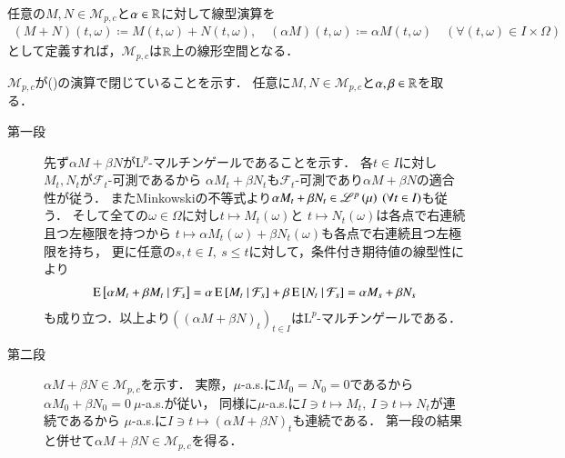 	\begin{screen}
		\begin{lem}
			任意の$M,N \in \mathcal{M}_{p,c}$と$\alpha \in \mathbb{R}$に対して線型演算を
			\begin{align}
				(M + N)(t,\omega) \coloneqq M(t,\omega) + N(t,\omega), 
				\quad (\alpha M)(t,\omega) \coloneqq \alpha M(t,\omega)
				\quad (\forall (t,\omega) \in I \times \Omega)
				\label{eq:mart_linear_arithmetic_0}
			\end{align}
			として定義すれば，$\mathcal{M}_{p,c}$は$\mathbb{R}$上の線形空間となる．
		\end{lem}
	\end{screen}
	
	
	\begin{prf}
		$\mathcal{M}_{p,c}$が()の演算で閉じていることを示す．
		任意に$M,N \in \mathcal{M}_{p,c}$と$\alpha, \beta \in \mathbb{R}$を取る．
		\begin{description}
			\item[第一段]
				先ず$\alpha M + \beta N$が$\mathrm{L}^p$-マルチンゲールであることを示す．
				各$t \in I$に対し$M_t,N_t$が$\mathcal{F}_t$-可測であるから
				$\alpha M_t + \beta N_t$も$\mathcal{F}_t$-可測であり$\alpha M + \beta N$の適合性が従う．
				またMinkowskiの不等式より$\alpha M_t + \beta N_t \in \mathscr{L}^{p} \left(\mu\right)\ (\forall t \in I)$も従う．
				そして全ての$\omega \in \Omega$に対し$t \longmapsto M_t(\omega)$と
				$t \longmapsto N_t(\omega)$は各点で右連続且つ左極限を持つから
				$t \longmapsto \alpha M_t(\omega) + \beta N_t(\omega)$も各点で右連続且つ左極限を持ち，
				更に任意の$s,t \in I,\ s \leq t$に対して，条件付き期待値の線型性により
				\begin{align}
					\operatorname{E} \left[ \alpha M_t + \beta M_t \ \middle|\ \mathcal{F}_s \right] 
					= \alpha \operatorname{E} \left[ M_t \ \middle|\ \mathcal{F}_s \right] + \beta \operatorname{E} \left[ N_t \ \middle|\ \mathcal{F}_s \right] 
					= \alpha M_s + \beta N_s
				\end{align}
				も成り立つ．以上より$\left( (\alpha M + \beta N)_t \right)_{t \in I}$は$\mathrm{L}^p$-マルチンゲールである．
			
			\item[第二段]
				$\alpha M + \beta N \in \mathcal{M}_{p,c}$を示す．
				実際，$\mu$-a.s.に$M_0 = N_0 = 0$であるから$\alpha M_0 + \beta N_0 = 0\ \mu$-a.s.が従い，
				同様に$\mu$-a.s.に$I \ni t \longmapsto M_t,\ I \ni t \longmapsto N_t$が連続であるから
				$\mu$-a.s.に$I \ni t \longmapsto (\alpha M + \beta N)_t$も連続である．
				第一段の結果と併せて$\alpha M + \beta N \in \mathcal{M}_{p,c}$を得る．
				\QED
		\end{description}		
	\end{prf}
	
